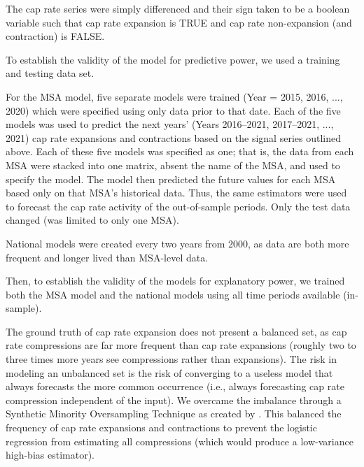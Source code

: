 \documentclass[jrfm,article,accept,oneauthor,pdftex]{Definitions/mdpi}
\begin{document}
The cap rate series were simply differenced and their sign taken to be a boolean variable such that cap rate expansion is TRUE and cap rate non-expansion (and contraction) is FALSE.

To establish the validity of the model for predictive power, we used a training and testing data set.

For the MSA model, five separate models were trained (Year = 2015, 2016, ..., 2020) which were specified using only data prior to that date. Each of the five models was used to predict the next years' (Years 2016--2021, 2017--2021, ..., 2021) cap rate expansions and contractions based on the signal series outlined above. Each of these five models was specified as one; that is, the data from each MSA were stacked into one matrix, absent the name of the MSA, and used to specify the model. The model then predicted the future values for each MSA based only on that MSA's historical data. Thus, the same estimators were used to forecast the cap rate activity of the out-of-sample periods. Only the test data changed (was limited to only one MSA).

National models were created every two years from 2000, as data are both more frequent and longer lived than MSA-level data. 

Then, to establish the validity of the models for explanatory power, we trained both the MSA model and the national models using all time periods available (in-sample).

The ground truth of cap rate expansion does not present a balanced set, as cap rate compressions are far more frequent than cap rate expansions (roughly two to three times more years see compressions rather than expansions). The risk in modeling an unbalanced set is the risk of converging to a useless model that always forecasts the more common occurrence (i.e., always forecasting cap rate compression independent of the input). We overcame the imbalance through a Synthetic Minority Oversampling Technique as created by \citep{SMOTE}. This balanced the frequency of cap rate expansions and contractions to prevent the logistic regression from estimating all compressions (which would produce a low-variance high-bias estimator).
\end{document}
